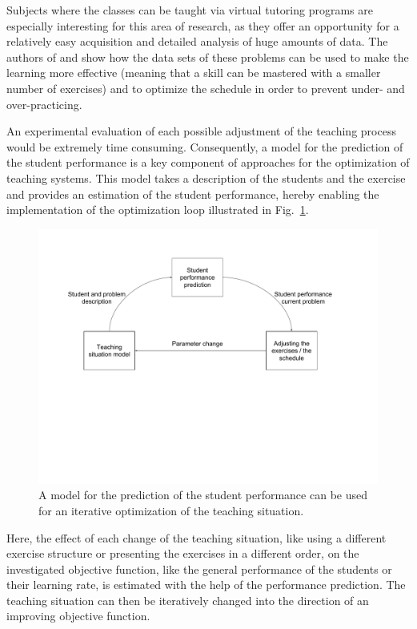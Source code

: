 Subjects where the classes can be taught via virtual tutoring programs are especially interesting for this area of research, as they offer an opportunity for a relatively easy acquisition and detailed analysis of huge amounts of data. The authors of \cite{machine_learning1} and \cite{machine_learning2} show how the data sets of these problems can be used to make the learning more effective (meaning that a skill can be mastered with a smaller number of exercises) and to optimize the schedule in order to prevent under- and over-practicing.

An experimental evaluation of each possible adjustment of the teaching process would be extremely time consuming. Consequently, a model for the prediction of the student performance is a key component of approaches for the optimization of teaching systems. This model takes a description of the students and the exercise and provides an estimation of the student performance, hereby enabling the implementation of the optimization loop illustrated in Fig.~\ref{fig_data_model}.

\begin{figure}
	\centering
	\includegraphics[width=\textwidth]{./img/data_model.pdf}
	\vspace{-3.5cm}
	\caption{A model for the prediction of the student performance can be used for an iterative optimization of the teaching situation.\label{fig_data_model}}
\end{figure}

Here, the effect of each change of the teaching situation, like using a different exercise structure or presenting the exercises in a different order, on the investigated objective function, like the general performance of the students or their learning rate, is estimated with the help of the performance prediction. The teaching situation can then be iteratively changed into the direction of an improving objective function.

